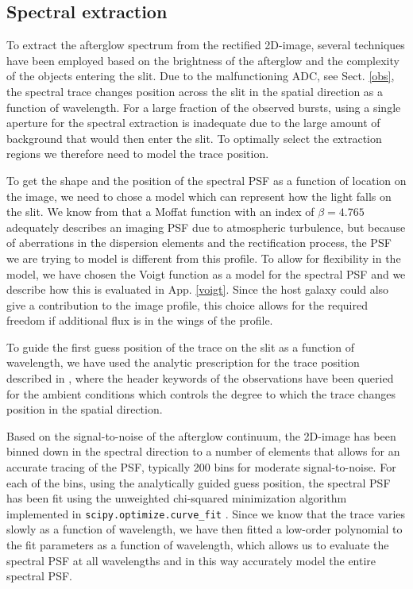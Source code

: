 \documentclass{aa}    %
\begin{document}
\subsection{Spectral extraction}    \label{extract}

To extract the afterglow spectrum from the rectified 2D-image, several
techniques have been employed based on the brightness of the afterglow and the
complexity of the objects entering the slit. Due to the malfunctioning ADC, see
Sect. \ref{obs}, the spectral trace changes position across the slit in the
spatial direction as a function of wavelength. For a large fraction of the
observed bursts, using a single aperture for the spectral extraction is
inadequate due to the large amount of background that would then enter the slit.
To optimally select the extraction regions we therefore need to model the trace
position.

To get the shape and the position of the spectral PSF as a function of location
on the image, we need to chose a model which can represent how the light falls
on the slit. We know from \citet{Trujillo2001} that a Moffat function
\citep{Moffat1969} with an index of $\beta = 4.765$ adequately describes an
imaging PSF due to atmospheric turbulence, but because of aberrations in the
dispersion elements and the rectification process, the PSF we are trying to
model is different from this profile. To allow for flexibility in the model, we
have chosen the Voigt function as a model for the spectral PSF and we describe
how this is evaluated in App. \ref{voigt}. Since the host galaxy could also give
a contribution to the image profile, this choice allows for the required freedom
if additional flux is in the wings of the profile.

To guide the first guess position of the trace on the slit as a function of
wavelength, we have used the analytic prescription for the trace position
described in \citet{Filippenko1982}, where the header keywords of the
observations have been queried for the ambient conditions which controls the
degree to which the trace changes position in the spatial direction.

Based on the signal-to-noise of the afterglow continuum, the 2D-image has been
binned down in the spectral direction to a number of elements that allows for an
accurate tracing of the PSF, typically 200 bins for moderate signal-to-noise.
For each of the bins, using the analytically guided guess position, the spectral
PSF has been fit using the unweighted chi-squared minimization algorithm
implemented in \texttt{scipy.optimize.curve\_fit} \citep{scipy}. Since we know
that the trace varies slowly as a function of wavelength, we have then fitted a
low-order polynomial to the fit parameters as a function of wavelength, which
allows us to evaluate the spectral PSF at all wavelengths and in this way
accurately model the entire spectral PSF.
\end{document}
